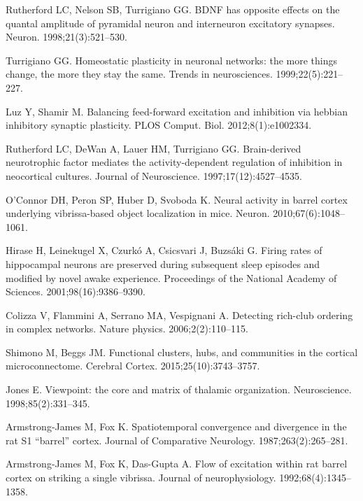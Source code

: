 \documentclass[10pt,letterpaper]{article}
\begin{document}
\begin{thebibliography}{10}
Rutherford LC, Nelson SB, Turrigiano GG.
\newblock BDNF has opposite effects on the quantal amplitude of pyramidal
  neuron and interneuron excitatory synapses.
\newblock Neuron. 1998;21(3):521--530.

Turrigiano GG.
\newblock Homeostatic plasticity in neuronal networks: the more things change,
  the more they stay the same.
\newblock Trends in neurosciences. 1999;22(5):221--227.

Luz Y, Shamir M.
\newblock Balancing feed-forward excitation and inhibition via hebbian inhibitory synaptic plasticity.
\newblock PLOS Comput. Biol. 2012;8(1):e1002334.

Rutherford LC, DeWan A, Lauer HM, Turrigiano GG.
\newblock Brain-derived neurotrophic factor mediates the activity-dependent
  regulation of inhibition in neocortical cultures.
\newblock Journal of Neuroscience. 1997;17(12):4527--4535.

O'Connor DH, Peron SP, Huber D, Svoboda K.
\newblock Neural activity in barrel cortex underlying vibrissa-based object
  localization in mice.
\newblock Neuron. 2010;67(6):1048--1061.

Hirase H, Leinekugel X, Czurk{\'o} A, Csicsvari J, Buzs{\'a}ki G.
\newblock Firing rates of hippocampal neurons are preserved during subsequent
  sleep episodes and modified by novel awake experience.
\newblock Proceedings of the National Academy of Sciences.
  2001;98(16):9386--9390.

Colizza V, Flammini A, Serrano MA, Vespignani A.
\newblock Detecting rich-club ordering in complex networks.
\newblock Nature physics. 2006;2(2):110--115.

Shimono M, Beggs JM.
\newblock Functional clusters, hubs, and communities in the cortical
  microconnectome.
\newblock Cerebral Cortex. 
2015;25(10):3743--3757.

Jones E.
\newblock Viewpoint: the core and matrix of thalamic organization.
\newblock Neuroscience. 1998;85(2):331--345.

Armstrong-James M, Fox K.
\newblock Spatiotemporal convergence and divergence in the rat S1 “barrel”
  cortex.
\newblock Journal of Comparative Neurology. 1987;263(2):265--281.

Armstrong-James M, Fox K, Das-Gupta A.
\newblock Flow of excitation within rat barrel cortex on striking a single
  vibrissa.
\newblock Journal of neurophysiology. 1992;68(4):1345--1358.


\end{thebibliography}
\end{document}
